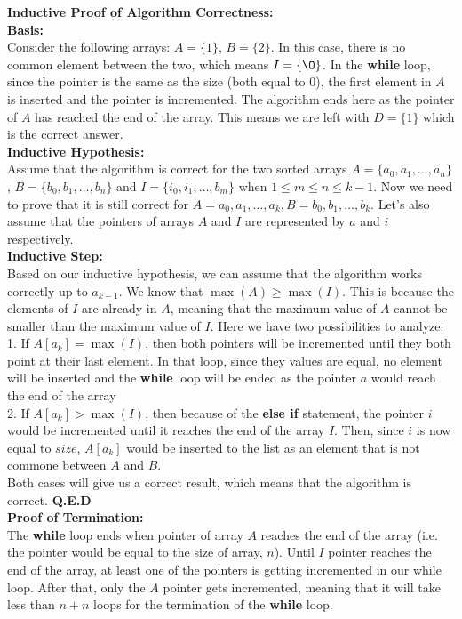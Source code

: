     \textbf{Inductive Proof of Algorithm Correctness:} \\
    \textbf{Basis:} \\
    Consider the following arrays: $A=\{1\}$, $B=\{2\}$. In this case, there is no common element between the two, which means $I=\{ \O \}$.
    In the \textbf{while} loop, since the pointer is the same as the size (both equal to 0), the first element in $A$ is inserted and the pointer is incremented. 
    The algorithm ends here as the pointer of $A$ has reached the end of the array. This means we are left with $D=\{1\}$ which is the correct answer. \\
    \textbf{Inductive Hypothesis:} \\
    Assume that the algorithm is correct for the two sorted arrays $A=\{a_0, a_1, \ldots, a_n\}$, $B=\{b_0, b_1, \ldots, b_n\}$ and $I=\{i_0, i_1, \ldots, b_m\}$ when $1 \leq m \leq n \leq k-1$.
    Now we need to prove that it is still correct for $A={a_0, a_1, \ldots, a_k}, B={b_0, b_1, \ldots, b_k}$. Let's also assume that the pointers
    of arrays $A$ and $I$ are represented by $a$ and $i$ respectively. \\ 
    \textbf{Inductive Step:} \\
    Based on our inductive hypothesis, we can assume that the algorithm works correctly up to $a_{k-1}$. We know that $\max(A) \geq \max(I)$. This is because the elements of $I$ are already in $A$, meaning that the maximum value of $A$ cannot be smaller than
    the maximum value of $I$. Here we have two possibilities to analyze: \\
    1. If $A[a_k] = \max(I)$, then both pointers will be incremented until they both point at their last element. In that loop, since they values are equal,
    no element will be inserted and the \textbf{while} loop will be ended as the pointer $a$ would reach the end of the array \\
    2. If $A[a_k] > \max(I)$, then because of the \textbf{else if} statement, the pointer $i$ would be incremented until it reaches the end of the array $I$. Then, since $i$ is now equal to $size$, $A[a_k]$ would be
    inserted to the list as an element that is not commone between $A$ and $B$. \\
    Both cases will give us a correct result, which means that the algorithm is correct.
    \textbf{Q.E.D} \\

    \textbf{Proof of Termination:} \\
    The \textbf{while} loop ends when pointer of array $A$ reaches the end of the array (i.e. the pointer would be equal to the size of array, $n$). Until $I$ pointer reaches the end of the array, at least one of the pointers is
    getting incremented in our while loop. After that, only the $A$ pointer gets incremented, meaning that it will take less than $n+n$ loops for the termination of the \textbf{while} loop.